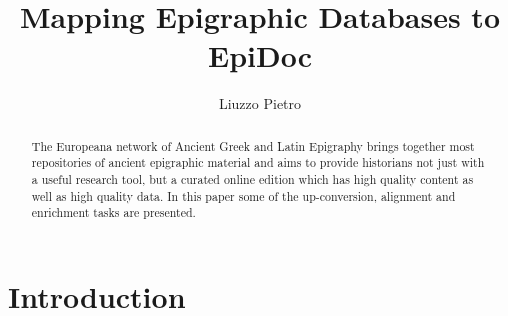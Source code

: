 \documentclass[amsthm,ebook]{saparticle}
\title{Mapping Epigraphic Databases to EpiDoc}
\author[UHEI]{Liuzzo Pietro\corref{first}}
\begin{document}
\maketitle

\begin{abstract}
The Europeana network of Ancient Greek and Latin Epigraphy brings
together most repositories of ancient epigraphic material and aims to
provide historians not just with a useful research tool, but a
curated online edition which has high quality content as well as high
quality data.  In this paper some of the up-conversion, alignment and enrichment tasks are presented.
 
\end{abstract}


\section{Introduction}\label{sec:intro}
\end{document}
